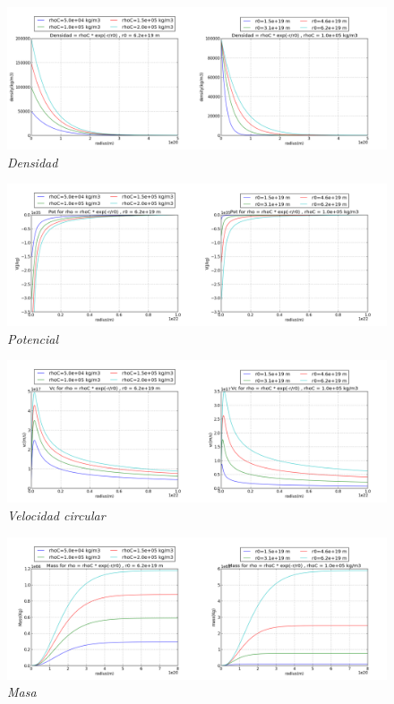 \documentclass[12pt]{book}
\begin{document}
\begin{figure}[!ht]
 \centering
 \includegraphics[scale=0.33]{densFinal.png}
 \caption{\emph{Densidad}}
\end{figure}


\begin{figure}[!ht]
 \centering
 \includegraphics[scale=0.33]{potFinal.png}
 \caption{\emph{Potencial}}
\end{figure}


\begin{figure}[!ht]
 \centering
 \includegraphics[scale=0.33]{vcFinal.png}
 \caption{\emph{Velocidad circular}}
\end{figure}


\begin{figure}[!ht]
 \centering
 \includegraphics[scale=0.33]{massFinal.png}
 \caption{\emph{Masa}}
\end{figure}
\end{document}
